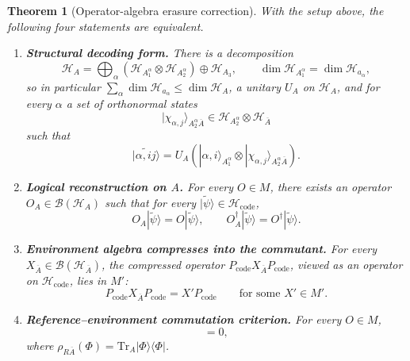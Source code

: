 \documentclass[11pt]{article}
\newcommand{\mH}{\mathcal{H}}
\newcommand{\mB}{\mathcal{B}}
\newcommand{\Tr}{\mathrm{Tr}}
\newcommand{\barA}{\overline{A}}
\newcommand{\ket}[1]{|#1\rangle}
\newcommand{\bra}[1]{\langle #1|}
\newcommand{\code}{\mathrm{code}}
\newcommand{\wt}[1]{\widetilde{#1}}
\newtheorem{theorem}{Theorem}
\begin{document}
\begin{theorem}[Operator-algebra erasure correction]
\label{thm:harlow-oa-qec}
With the setup above, the following four statements are equivalent.

\begin{enumerate}
    \item \textbf{Structural decoding form.}
    There is a decomposition
    \begin{equation}
        \mH_A
        =
        \bigoplus_\alpha
        \left(
        \mH_{A_1^\alpha}\otimes \mH_{A_2^\alpha}
        \right)
        \oplus \mH_{A_3},
        \qquad
        \dim \mH_{A_1^\alpha}=\dim \mH_{a_\alpha},
        \label{eq:A-decomp}
    \end{equation}
    so in particular \(\sum_\alpha \dim \mH_{a_\alpha}\leq \dim \mH_A\), a
    unitary \(U_A\) on \(\mH_A\), and for every \(\alpha\) a set of orthonormal
    states
    \[
        \ket{\chi_{\alpha,j}}_{A_2^\alpha\barA}
        \in
        \mH_{A_2^\alpha}\otimes \mH_{\barA}
    \]
    such that
    \begin{equation}
        \ket{\wt{\alpha,ij}}
        =
        U_A
        \left(
        \ket{\alpha,i}_{A_1^\alpha}
        \otimes
        \ket{\chi_{\alpha,j}}_{A_2^\alpha\barA}
        \right).
        \label{eq:structure-decoding}
    \end{equation}

    \item \textbf{Logical reconstruction on \(A\).}
    For every \(O\in M\), there exists an operator \(O_A\in\mB(\mH_A)\) such
    that for every \(\ket{\wt{\psi}}\in\mH_{\code}\),
    \begin{equation}
        O_A\ket{\wt{\psi}}=O\ket{\wt{\psi}},
        \qquad
        O_A^\dagger\ket{\wt{\psi}}=O^\dagger\ket{\wt{\psi}}.
        \label{eq:reconstruction-A}
    \end{equation}

    \item \textbf{Environment algebra compresses into the commutant.}
    For every \(X_{\barA}\in\mB(\mH_{\barA})\), the compressed operator
    \(P_{\code}X_{\barA}P_{\code}\), viewed as an operator on
    \(\mH_{\code}\), lies in \(M'\):
    \begin{equation}
        P_{\code}X_{\barA}P_{\code}
        =
        X'P_{\code}
        \qquad
        \text{for some } X'\in M'.
        \label{eq:compressed-environment}
    \end{equation}

    \item \textbf{Reference--environment commutation criterion.}
    For every \(O\in M\),
    \begin{equation}
        [O_R,\rho_{R\barA}(\Phi)]=0,
        \label{eq:reference-criterion}
    \end{equation}
    where \(\rho_{R\barA}(\Phi)=\Tr_A\ket{\Phi}\bra{\Phi}\).
\end{enumerate}
\end{theorem}
\end{document}
